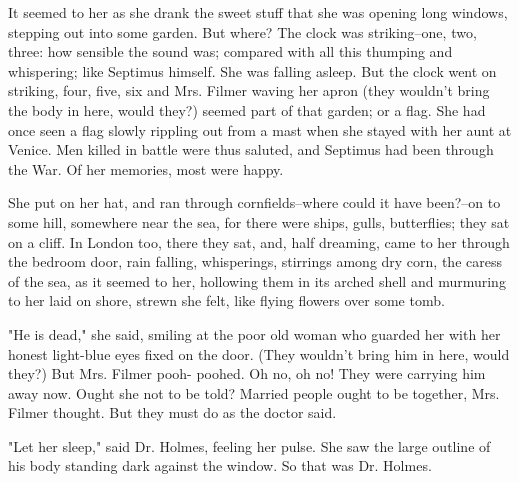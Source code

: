 \documentclass[lang=cn,10pt]{elegantbook}
\begin{document}
It seemed to her as she drank the sweet stuff that she was opening
long windows, stepping out into some garden.  But where?  The clock
was striking--one, two, three: how sensible the sound was; compared
with all this thumping and whispering; like Septimus himself.  She
was falling asleep.  But the clock went on striking, four, five,
six and Mrs. Filmer waving her apron (they wouldn't bring the body
in here, would they?) seemed part of that garden; or a flag.  She
had once seen a flag slowly rippling out from a mast when she
stayed with her aunt at Venice.  Men killed in battle were thus
saluted, and Septimus had been through the War.  Of her memories,
most were happy.

She put on her hat, and ran through cornfields--where could it have
been?--on to some hill, somewhere near the sea, for there were
ships, gulls, butterflies; they sat on a cliff.  In London too,
there they sat, and, half dreaming, came to her through the bedroom
door, rain falling, whisperings, stirrings among dry corn, the
caress of the sea, as it seemed to her, hollowing them in its
arched shell and murmuring to her laid on shore, strewn she felt,
like flying flowers over some tomb.

"He is dead," she said, smiling at the poor old woman who guarded
her with her honest light-blue eyes fixed on the door.  (They
wouldn't bring him in here, would they?)  But Mrs. Filmer pooh-
poohed.  Oh no, oh no!  They were carrying him away now.  Ought she
not to be told?  Married people ought to be together, Mrs. Filmer
thought.  But they must do as the doctor said.

"Let her sleep," said Dr. Holmes, feeling her pulse.  She saw the
large outline of his body standing dark against the window.  So
that was Dr. Holmes.
\end{document}
